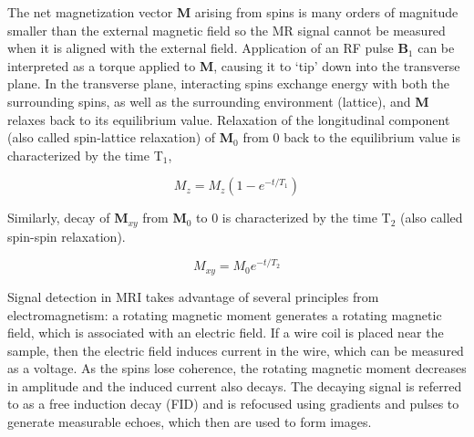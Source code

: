 The net magnetization vector \textbf{M} arising from spins is many orders of magnitude smaller than the external magnetic field so the MR signal cannot be measured when it is aligned with the external field. 
Application of an RF pulse \textbf{B$_1$} can be interpreted as a torque applied to \textbf{M}, causing it to `tip' down into the transverse plane. 
In the transverse plane, interacting spins exchange energy with both the surrounding spins, as well as the surrounding environment (lattice), and \textbf{M} relaxes back to its equilibrium value. 
Relaxation of the longitudinal component (also called spin-lattice relaxation) of \textbf{M$_0$} from 0 back to the equilibrium value is characterized by the time T$_1$,

\begin{equation}
	M_z = M_z (1-e^{-t/T_1})
	\label{T1}
\end{equation}
		
		Similarly, decay of \textbf{M$_{xy}$} from \textbf{M$_0$} to 0 is characterized by the time T$_2$ (also called spin-spin relaxation).
		
\begin{equation}
		M_{xy} = M_0 e^{-t/T_2}
		\label{T2}
\end{equation}
			
	

Signal detection in MRI takes advantage of several principles from electromagnetism: a rotating magnetic moment generates a rotating magnetic field, which is associated with an electric field. 
If a wire coil is placed near the sample, then the electric field induces current in the wire, which can be measured as a voltage. 
As the spins lose coherence, the rotating magnetic moment decreases in amplitude and the induced current also decays. 
The decaying signal is referred to as a free induction decay (FID) and is refocused using gradients and pulses to generate measurable echoes, which then are used to form images.

